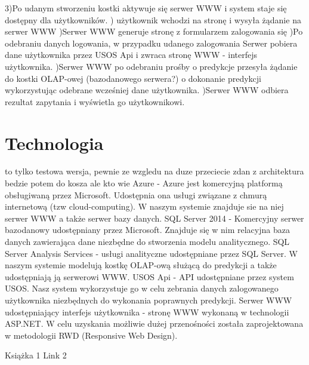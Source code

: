 \documentclass[licencjacka]{pracamgr}
\begin{document}
3)Po udanym stworzeniu kostki aktywuje się serwer WWW i system staje się dostępny dla użytkowników. ) użytkownik wchodzi na stronę i wysyła żądanie na serwer WWW )Serwer WWW generuje stronę z formularzem zalogowania się )Po odebraniu danych logowania, w przypadku udanego zalogowania Serwer pobiera dane użytkownika przez USOS Api i zwraca stronę WWW - interfejs użytkownika. )Serwer WWW po odebraniu prośby o predykcje przesyła żądanie do kostki OLAP-owej (bazodanowego serwera?) o dokonanie predykcji wykorzystując odebrane wcześniej dane użytkownika. )Serwer WWW odbiera rezultat zapytania i wyświetla go użytkownikowi. \newline

 \chapter{Technologia}
to tylko testowa wersja, pewnie ze wzgledu na duze przeciecie zdan z architektura bedzie potem do kosza ale kto wie \newline
Azure - Azure jest komercyjną platformą obsługiwaną przez Microsoft. Udostępnia ona usługi związane z chmurą internetową (tzw cloud-computing). W naszym systemie znajduje sie na niej serwer WWW a także serwer bazy danych. \newline
SQL Server 2014 - Komercyjny serwer bazodanowy udostępniany przez Microsoft. Znajduje się w nim relacyjna baza danych zawierająca dane niezbędne do stworzenia modelu analitycznego. \newline
SQL Server Analysis Services - usługi analityczne udostępniane przez SQL Server. W naszym systemie modelują kostkę OLAP-ową służącą do predykcji a także udostępniają ją serwerowi WWW. \newline
USOS Api - API udostępniane przez system USOS. Nasz system wykorzystuje go w celu zebrania danych zalogowanego użytkownika niezbędnych do wykonania poprawnych predykcji. \newline
Serwer WWW udostępniający interfejs użytkownika - stronę WWW wykonaną w technologii ASP.NET. W celu uzyskania możliwie dużej przenośności została zaprojektowana w metodologii RWD (Responsive Web Design).  \newline
\begin{thebibliography}{99}
 Książka 1
 Link 2
\end{thebibliography}
\end{document}
